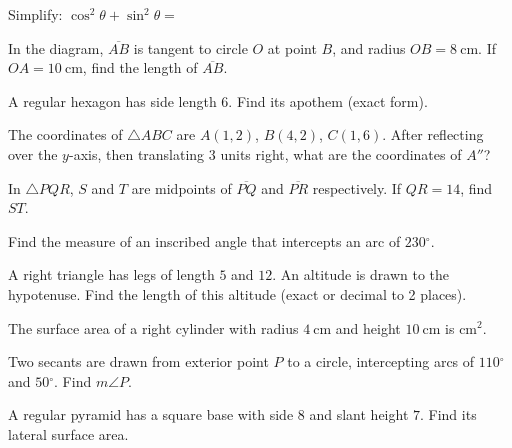 \documentclass[12pt,addpoints]{exam}
\newcommand{\answerbox}[1]{\underline{\hspace{#1}}}
\newcommand{\deg}{{}^\circ}
\begin{document}
\begin{questions}

\question Simplify: $\cos^2 \theta + \sin^2 \theta =$ \answerbox{3cm}

\question In the diagram, $\overline{AB}$ is tangent to circle $O$ at point $B$, and radius $OB = 8~\text{cm}$. If $OA = 10~\text{cm}$, find the length of $\overline{AB}$.

\vspace{1.5cm}

\question A regular hexagon has side length $6$. Find its apothem (exact form).

\vspace{1.5cm}

\question The coordinates of $\triangle ABC$ are $A(1, 2)$, $B(4, 2)$, $C(1, 6)$. After reflecting over the $y$-axis, then translating $3$ units right, what are the coordinates of $A''$?

\vspace{1.5cm}

\question In $\triangle PQR$, $S$ and $T$ are midpoints of $\overline{PQ}$ and $\overline{PR}$ respectively. If $QR = 14$, find $ST$.

\vspace{1.5cm}

\question Find the measure of an inscribed angle that intercepts an arc of $230\deg$.

\vspace{1.5cm}

\question A right triangle has legs of length $5$ and $12$. An altitude is drawn to the hypotenuse. Find the length of this altitude (exact or decimal to 2 places).

\vspace{1.5cm}

\question The surface area of a right cylinder with radius $4~\text{cm}$ and height $10~\text{cm}$ is \answerbox{4cm} $\text{cm}^2$.

\question Two secants are drawn from exterior point $P$ to a circle, intercepting arcs of $110\deg$ and $50\deg$. Find $m\angle P$.

\vspace{1.5cm}

\question A regular pyramid has a square base with side $8$ and slant height $7$. Find its lateral surface area.

\vspace{1.5cm}

\end{questions}
\end{document}
